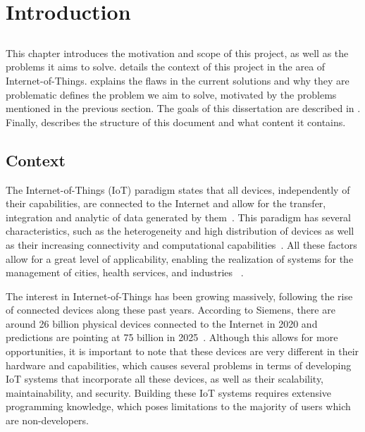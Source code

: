 \chapter{Introduction} \label{chap:intro}

\section*{}

\minitoc \mtcskip \noindent
This chapter introduces the motivation and scope of this project, as well as the problems it aims to solve.  details the context of this project in the area of Internet-of-Things.  explains the flaws in the current solutions and why they are problematic  defines the problem we aim to solve, motivated by the problems mentioned in the previous section. The goals of this dissertation are described in . Finally,  describes the structure of this document and what content it contains.

\section{Context} \label{sec:context}

The Internet-of-Things (IoT) paradigm states that all devices, independently of their capabilities, are connected to the Internet and allow for the transfer, integration and analytic of data generated by them~\cite{IoT_principles_and_paradigms}. This paradigm has several characteristics, such as the heterogeneity and high distribution of devices as well as their increasing connectivity and computational capabilities~\cite{SoS}. All these factors allow for a great level of applicability, enabling the realization of systems for the management of cities, health services, and industries ~\cite{6851114}.

The interest in Internet-of-Things has been growing massively, following the rise of connected devices along these past years. According to Siemens, there are around 26 billion physical devices connected to the Internet in 2020 and predictions are pointing at 75 billion in 2025~\cite{tanweer}. Although this allows for more opportunities, it is important to note that these devices are very different in their hardware and capabilities, which causes several problems in terms of developing IoT systems that incorporate all these devices, as well as their scalability, maintainability, and security. Building these IoT systems requires extensive programming knowledge, which poses limitations to the majority of users which are non-developers.


